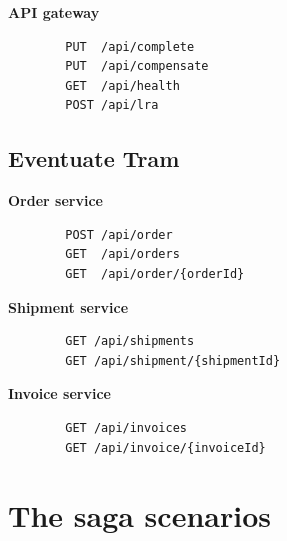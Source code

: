 \documentclass[oneside,
  digital, %
  table,   %
  nolof,     %
  nolot,     %
]{fithesis3}
\begin{document}
\noindent
\textbf{API gateway}

\begin{verbatim}
        PUT  /api/complete
        PUT  /api/compensate
        GET  /api/health
        POST /api/lra
\end{verbatim}


\section{Eventuate Tram}

\textbf{Order service}

\begin{verbatim}
        POST /api/order
        GET  /api/orders
        GET  /api/order/{orderId}
\end{verbatim}

\noindent
\textbf{Shipment service}

\begin{verbatim}
        GET /api/shipments
        GET /api/shipment/{shipmentId}
\end{verbatim}

\noindent
\textbf{Invoice service}

\begin{verbatim}
        GET /api/invoices
        GET /api/invoice/{invoiceId}
\end{verbatim}




\chapter{The saga scenarios}
\end{document}
